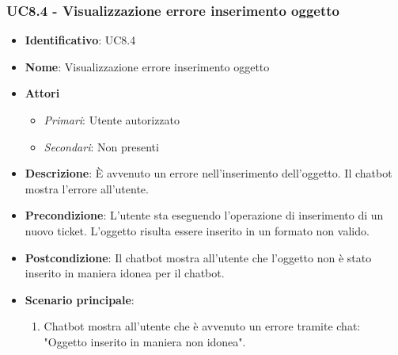 \subsubsection{UC8.4 - Visualizzazione errore inserimento oggetto}
\begin{itemize}
	\item \textbf{Identificativo}: UC8.4
	\item \textbf{Nome}: Visualizzazione errore inserimento oggetto 
	\item \textbf{Attori}
	\begin{itemize} 
		\item \textit{Primari}: Utente autorizzato
		\item \textit{Secondari}: Non presenti
	\end{itemize}
	\item \textbf{Descrizione}: È avvenuto un errore nell'inserimento dell'oggetto. Il chatbot mostra l'errore all'utente.
	\item \textbf{Precondizione}: L'utente sta eseguendo l'operazione di inserimento di un nuovo ticket. L'oggetto risulta essere inserito in un formato non valido. 
	\item \textbf{Postcondizione}: Il chatbot mostra all'utente che l'oggetto non è stato inserito in maniera idonea per il chatbot.
	\item \textbf{Scenario principale}: \begin{enumerate}
		\item Chatbot mostra all'utente che è avvenuto un errore tramite chat: "Oggetto inserito in maniera non idonea".
		\end{enumerate}
\end{itemize}


